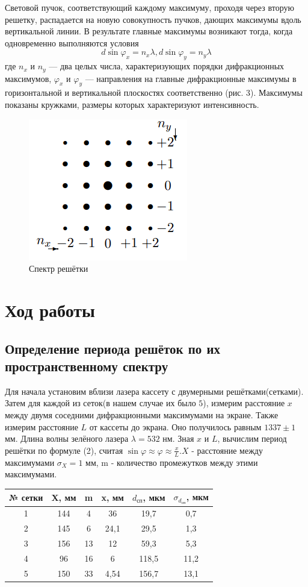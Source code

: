 \documentclass[a4paper,12pt]{article}
\begin{document}
Световой пучок, соответствующий каждому максимуму, проходя через вторую решетку, распадается на новую совокупность пучков, дающих максимумы вдоль вертикальной линии. В результате главные максимумы возникают тогда, когда одновременно выполняются условия
\begin{equation}
d \sin \varphi_x = n_x \lambda, d \sin \varphi_y = n_y \lambda 
\end{equation}
где $n_x$ и $n_y$ — два целых числа, характеризующих порядки дифракционных максимумов, $\varphi_x$ и $\varphi_y$ — направления на главные дифракционные максимумы в горизонтальной и вертикальной плоскостях соответственно (рис. 3). Максимумы показаны кружками, размеры которых характеризуют интенсивность.
\begin{figure}[H]
	\centering
	\includegraphics[scale=1]{scheme3.png}
	\caption{Спектр решётки}
\end{figure}
\section{Ход работы}
\subsection*{Определение периода решёток по их пространственному спектру}
Для начала установим вблизи лазера кассету с двумерными решётками(сетками). Затем для каждой из сеток(в нашем случае их было $5$), измерим расстояние $x$ между двумя соседними дифракционными максимумами на экране. Также измерим расстояние $L$ от кассеты до экрана. Оно получилось равным $1337 \pm 1$ мм. Длина волны зелёного лазера $\lambda = 532$ нм. Зная $x$ и $L$, вычислим период решётки по формуле (2), считая $\sin \varphi \approx \varphi \approx \frac{x}{L}$.$X$ - расстояние между максимумами $\sigma_X = 1$ мм, m - количество промежутков между этими максимумами.
\begin{table}[H]
	\centering
	\begin{tabular}{|c|c|c|c|c|c|}
	\hline
	№ сетки & X, мм & m & x, мм & $d_\text{сп}$, мкм & $\sigma_{d_\text{сп}}$, мкм\\ \hline
	1 & 144 & 4 & 36 & 19,7 & 0,7\\ \hline
	2 & 145 & 6 & 24,1 & 29,5 & 1,3\\ \hline
	3 & 156 & 13 & 12 & 59,3 & 5,3\\ \hline
	4 & 96 & 16 & 6 & 118,5 & 11,2\\ \hline
	5 & 150 & 33 & 4,54 & 156,7 & 13,1\\ \hline
	\end{tabular}
\end{table}
\end{document}
